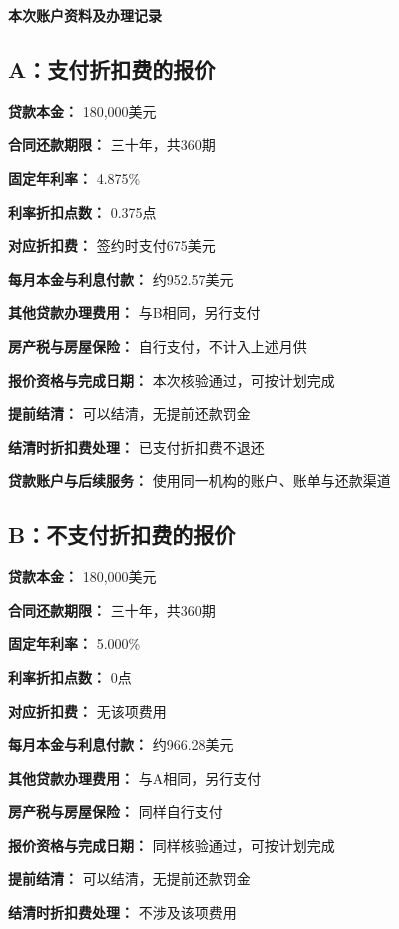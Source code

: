 \documentclass[UTF8,fontset=none,11pt,a4paper]{ctexart}
\begin{document}
{\noindent\fontsize{20}{25}\selectfont\bfseries 本次账户资料及办理记录\par}
\vspace{10pt}
\subsection*{A：支付折扣费的报价}
\textbf{贷款本金：} 180,000美元


\textbf{合同还款期限：} 三十年，共360期


\textbf{固定年利率：} 4.875\%


\textbf{利率折扣点数：} 0.375点


\textbf{对应折扣费：} 签约时支付675美元


\textbf{每月本金与利息付款：} 约952.57美元


\textbf{其他贷款办理费用：} 与B相同，另行支付


\textbf{房产税与房屋保险：} 自行支付，不计入上述月供


\textbf{报价资格与完成日期：} 本次核验通过，可按计划完成


\textbf{提前结清：} 可以结清，无提前还款罚金


\textbf{结清时折扣费处理：} 已支付折扣费不退还


\textbf{贷款账户与后续服务：} 使用同一机构的账户、账单与还款渠道


\subsection*{B：不支付折扣费的报价}
\textbf{贷款本金：} 180,000美元


\textbf{合同还款期限：} 三十年，共360期


\textbf{固定年利率：} 5.000\%


\textbf{利率折扣点数：} 0点


\textbf{对应折扣费：} 无该项费用


\textbf{每月本金与利息付款：} 约966.28美元


\textbf{其他贷款办理费用：} 与A相同，另行支付


\textbf{房产税与房屋保险：} 同样自行支付


\textbf{报价资格与完成日期：} 同样核验通过，可按计划完成


\textbf{提前结清：} 可以结清，无提前还款罚金


\textbf{结清时折扣费处理：} 不涉及该项费用
\end{document}
